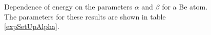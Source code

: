 	
	\begin{figure}[!hbt]
    \begin{center}
      \caption{Dependence of energy on the parameters $\alpha$ and $\beta$ for a Be atom. The parameters for these results are shown in table \ref{expSetUpAlpha}.}
      \label{alphaBetaBe}
    \end{center}
  \end{figure}


